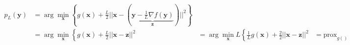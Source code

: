 \documentclass[preview,border=0.3pt]{standalone}
\begin{document}
%
\begin{align*}
p_L(\mathbf{y}) &= \arg\min_\mathbf{x}\left\{ g(\mathbf{x}) + \frac{L}{2}||\mathbf{x} - \left( \underbrace{\mathbf{y} - \frac{1}{L} \nabla f(\mathbf{y})}_{\mathbf{z}} \right)||^2 \right\}\\
%
&=\arg\min_\mathbf{x}\left\{ g(\mathbf{x}) + \frac{L}{2}||\mathbf{x} - \mathbf{z}||^2
&=\arg\min_\mathbf{x}L\left\{ \frac{1}{L}g(\mathbf{x}) + \frac{2}{2}||\mathbf{x} - \mathbf{z}||^2
&= \mathrm{prox}_{g()}
\end{align*}
\end{document}
